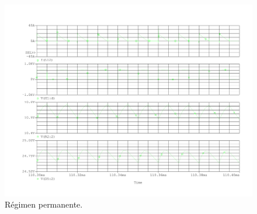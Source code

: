 \begin{figure}[H]
	\centering
	\includegraphics[scale=0.5]{Figuras/1_regimen_permanente.pdf}
	\caption{Régimen permanente.}
	\label{fig:permanente}
\end{figure}


